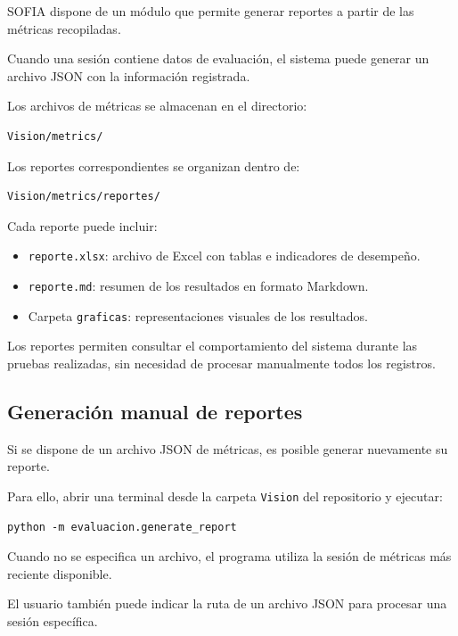 \documentclass[letterpaper,journal]{IEEEtran}
\begin{document}
SOFIA dispone de un módulo que
permite generar reportes a partir
de las métricas recopiladas.

Cuando una sesión contiene datos
de evaluación, el sistema puede
generar un archivo JSON con
la información registrada.

Los archivos de métricas se
almacenan en el directorio:

\begin{verbatim}
Vision/metrics/
\end{verbatim}

Los reportes correspondientes
se organizan dentro de:

\begin{verbatim}
Vision/metrics/reportes/
\end{verbatim}

Cada reporte puede incluir:

\begin{itemize}
    \item \texttt{reporte.xlsx}:
    archivo de Excel con tablas
    e indicadores de desempeño.

    \item \texttt{reporte.md}:
    resumen de los resultados
    en formato Markdown.

    \item Carpeta \texttt{graficas}:
    representaciones visuales
    de los resultados.
\end{itemize}

Los reportes permiten consultar
el comportamiento del sistema
durante las pruebas realizadas,
sin necesidad de procesar
manualmente todos los registros.

\subsection{Generación manual de reportes}

Si se dispone de un archivo JSON
de métricas, es posible generar
nuevamente su reporte.

Para ello, abrir una terminal
desde la carpeta \texttt{Vision}
del repositorio y ejecutar:

\begin{verbatim}
python -m evaluacion.generate_report
\end{verbatim}

Cuando no se especifica un archivo,
el programa utiliza la sesión
de métricas más reciente disponible.

El usuario también puede indicar
la ruta de un archivo JSON
para procesar una sesión específica.
\end{document}
